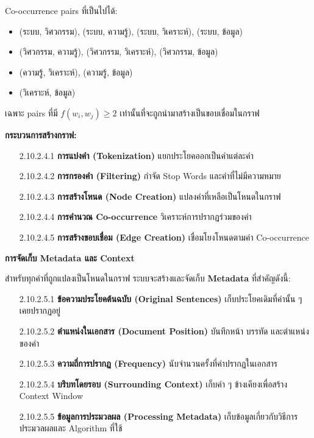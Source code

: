 \documentclass[12pt,a4paper]{article}
\begin{document}
\begin{enumerate}[leftmargin=2cm]
\begin{enumerate}
{\begin{enumerate}
            Co-occurrence pairs ที่เป็นไปได้:
            \begin{itemize}
                \item (ระบบ, วิศวกรรม), (ระบบ, ความรู้), (ระบบ, วิเคราะห์), (ระบบ, ข้อมูล)
                \item (วิศวกรรม, ความรู้), (วิศวกรรม, วิเคราะห์), (วิศวกรรม, ข้อมูล)
                \item (ความรู้, วิเคราะห์), (ความรู้, ข้อมูล)
                \item (วิเคราะห์, ข้อมูล)
            \end{itemize}

            เฉพาะ pairs ที่มี $f(w_i, w_j) \geq 2$ เท่านั้นที่จะถูกนำมาสร้างเป็นขอบเชื่อมในกราฟ

            \textbf{กระบวนการสร้างกราฟ:}

            \begin{enumerate}
                \item[2.10.2.4.1] \textbf{การแบ่งคำ (Tokenization)} แยกประโยคออกเป็นคำแต่ละคำ
                \item[2.10.2.4.2] \textbf{การกรองคำ (Filtering)} กำจัด Stop Words และคำที่ไม่มีความหมาย
                \item[2.10.2.4.3] \textbf{การสร้างโหนด (Node Creation)} แปลงคำที่เหลือเป็นโหนดในกราฟ
                \item[2.10.2.4.4] \textbf{การคำนวณ Co-occurrence} วิเคราะห์การปรากฏร่วมของคำ
                \item[2.10.2.4.5] \textbf{การสร้างขอบเชื่อม (Edge Creation)} เชื่อมโยงโหนดตามค่า Co-occurrence
            \end{enumerate}

            \vspace{0.3cm}

            \textbf{การจัดเก็บ Metadata และ Context}

            \hspace{1cm}สำหรับทุกคำที่ถูกแปลงเป็นโหนดในกราฟ ระบบจะสร้างและจัดเก็บ \textbf{Metadata} ที่สำคัญดังนี้:

            \begin{enumerate}
                \item[2.10.2.5.1] \textbf{ข้อความประโยคต้นฉบับ (Original Sentences)} เก็บประโยคเดิมที่คำนั้น ๆ เคยปรากฏอยู่
                \item[2.10.2.5.2] \textbf{ตำแหน่งในเอกสาร (Document Position)} บันทึกหน้า บรรทัด และตำแหน่งของคำ
                \item[2.10.2.5.3] \textbf{ความถี่การปรากฏ (Frequency)} นับจำนวนครั้งที่คำปรากฏในเอกสาร
                \item[2.10.2.5.4] \textbf{บริบทโดยรอบ (Surrounding Context)} เก็บคำ ๆ ข้างเคียงเพื่อสร้าง Context Window
                \item[2.10.2.5.5] \textbf{ข้อมูลการประมวลผล (Processing Metadata)} เก็บข้อมูลเกี่ยวกับวิธีการประมวลผลและ Algorithm ที่ใช้
            \end{enumerate}


\end{enumerate}}
\end{enumerate}
\end{enumerate}
\end{document}
